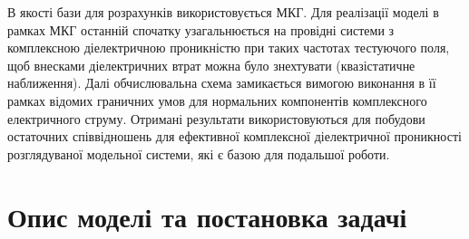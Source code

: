 \documentclass[14pt,twoside]{vakthesis}
\begin{document}
В якості бази для розрахунків використовується МКГ. Для реалізації моделі в рамках МКГ останній спочатку узагальнюється на провідні системи з комплексною діелектричною проникністю при таких частотах тестуючого поля, щоб внесками діелектричних втрат можна було знехтувати (квазістатичне наближення). Далі обчислювальна схема замикається вимогою виконання в її рамках відомих граничних умов для нормальних компонентів комплексного електричного струму.
Отримані результати використовуються для побудови остаточних співвідношень для ефективної комплексної діелектричної проникності  розглядуваної модельної системи, які є базою для подальшої роботи.

\vspace{40pt}

\section{Опис моделі та постановка задачі}
\end{document}
